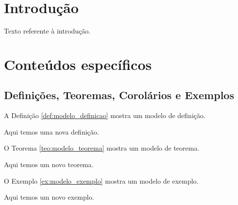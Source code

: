 \documentclass[12pt,a4paper,oneside]{abntex2}
\begin{document}

\tableofcontents*
\cleardoublepage


\textual

\chapter{Introdução}

Texto referente à introdução.

\chapter{Conteúdos específicos}
\label{cap:conteudos_especificos}

\section{Definições, Teoremas, Corolários e Exemplos}

A Definição \ref{def:modelo_definicao} mostra um modelo de definição.

\begin{definicao}
Aqui temos uma nova definição.
\label{def:modelo_definicao}
\end{definicao}

O Teorema \ref{teo:modelo_teorema} mostra um modelo de teorema.

\begin{teorema}
Aqui temos um novo teorema.
\label{teo:modelo_teorema}
\end{teorema}

O Exemplo \ref{ex:modelo_exemplo} mostra um modelo de exemplo.

\begin{exemplo}
Aqui temos um novo exemplo.
\label{ex:modelo_exemplo}
\end{exemplo}
\end{document}
